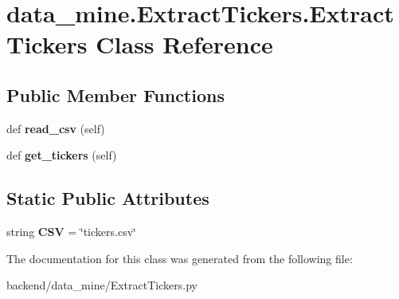 \hypertarget{classdata__mine_1_1_extract_tickers_1_1_extract_tickers}{}\section{data\+\_\+mine.\+Extract\+Tickers.\+Extract\+Tickers Class Reference}
\label{classdata__mine_1_1_extract_tickers_1_1_extract_tickers}
\subsection*{Public Member Functions}
\begin{DoxyCompactItemize}
\item 
\mbox{\label{classdata__mine_1_1_extract_tickers_1_1_extract_tickers_afa1e390dcab8f12d4a21735d3adf28ad}} 
def {\bfseries read\+\_\+csv} (self)
\item 
\mbox{\label{classdata__mine_1_1_extract_tickers_1_1_extract_tickers_aa8425c36c82a649fd313a4001eaf9583}} 
def {\bfseries get\+\_\+tickers} (self)
\end{DoxyCompactItemize}
\subsection*{Static Public Attributes}
\begin{DoxyCompactItemize}
\item 
\mbox{\label{classdata__mine_1_1_extract_tickers_1_1_extract_tickers_aa6fda0b0db87b9896190326cc3d79c9c}} 
string {\bfseries C\+SV} = \char`\"{}tickers.\+csv\char`\"{}
\end{DoxyCompactItemize}


The documentation for this class was generated from the following file\+:\begin{DoxyCompactItemize}
\item 
backend/data\+\_\+mine/Extract\+Tickers.\+py\end{DoxyCompactItemize}
